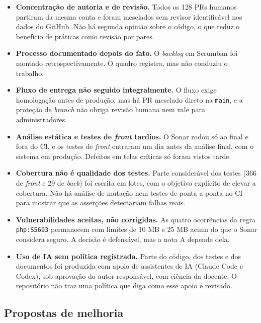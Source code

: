 \begin{itemize}
  \item \textbf{Concentração de autoria e de revisão.} Todos os 128 PRs humanos partiram da mesma conta e foram mesclados sem revisor identificável nos dados do GitHub. Não há segunda opinião sobre o código, o que reduz o benefício de práticas como revisão por pares.
  \item \textbf{Processo documentado depois do fato.} O \textit{backlog} em Scrumban foi montado retrospectivamente. O quadro registra, mas não conduziu o trabalho.
  \item \textbf{Fluxo de entrega não seguido integralmente.} O fluxo exige homologação antes de produção, mas há PR mesclado direto na \texttt{main}, e a proteção de \textit{branch} não obriga revisão humana nem vale para administradores.
  \item \textbf{Análise estática e testes de \textit{front} tardios.} O Sonar rodou só ao final e fora do CI, e os testes de \textit{front} entraram um dia antes da análise final, com o sistema em produção. Defeitos em telas críticas só foram vistos tarde.
  \item \textbf{Cobertura não é qualidade dos testes.} Parte considerável dos testes (366 de \textit{front} e 29 de \textit{back}) foi escrita em lotes, com o objetivo explícito de elevar a cobertura. Não há análise de mutação nem testes de ponta a ponta no CI para mostrar que as asserções detectariam falhas reais.
  \item \textbf{Vulnerabilidades aceitas, não corrigidas.} As quatro ocorrências da regra \texttt{php:S5693} permanecem com limites de 10 MB e 25 MB acima do que o Sonar considera seguro. A decisão é defensável, mas a nota A depende dela.
  \item \textbf{Uso de IA sem política registrada.} Parte do código, dos testes e dos documentos foi produzida com apoio de assistentes de IA (Claude Code e Codex), sob aprovação do autor responsável, com ciência da docente.
  O repositório não traz uma política que diga como esse apoio é revisado.
\end{itemize}

\subsection{Propostas de melhoria}


